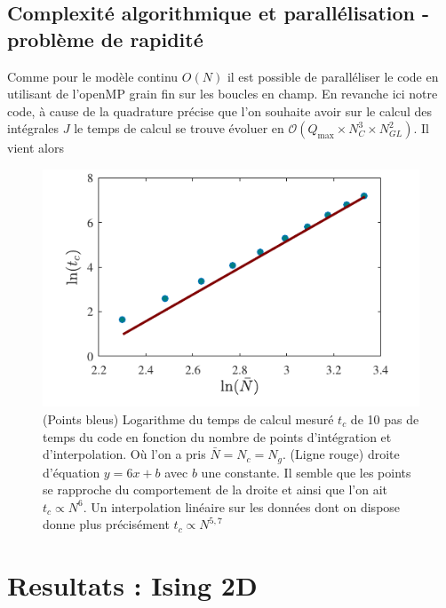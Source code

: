 \documentclass[10pt]{article}
\begin{document}
\begin{multicols}{2}
\subsection{Complexité algorithmique et parallélisation - problème de rapidité} 

Comme pour le modèle continu $O(N)$ il est possible de paralléliser le code en utilisant de l'openMP \cite{} grain fin sur les boucles en champ. En revanche ici notre code, à cause de la quadrature précise que l'on souhaite avoir sur le calcul des intégrales $J$ le temps de calcul se trouve évoluer en $\mathcal{O}( Q_\text{max} \times N_C^3 \times N_{GL}^2)$. Il vient alors 
\begin{figure}[H]
\begin{center}
	\includegraphics[width=0.95\columnwidth]{ComplexiteTemps.pdf}
\end{center}
\caption{(Points bleus) Logarithme du temps de calcul mesuré $t_c$ de 10 pas de temps du code en fonction du nombre de points d'intégration et d'interpolation. Où l'on a pris $\bar{N} = N_c = N_g$. (Ligne rouge) droite d'équation $y=6x+b$ avec $b$ une constante. Il semble que les points se rapproche du comportement de la droite et ainsi que l'on ait $t_c \propto N^6$. Un interpolation linéaire sur les données dont on dispose donne plus précisément $t_c \propto N^{5,7} $   }
\end{figure}


\section{Resultats : Ising 2D}



\end{multicols}
\end{document}
